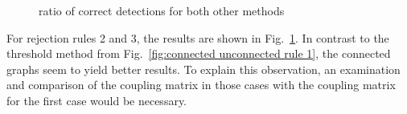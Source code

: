 \documentclass{article}
\begin{document}
	 	
	\begin{figure}[h]
	\caption{ratio of correct detections for both other methods}
	\label{fig:connected unconnected rule 2 and 3}
	\end{figure}
For rejection rules 2 and 3, the results are shown in Fig.~\ref{fig:connected unconnected rule 2 and 3}. In contrast to the threshold method from Fig.~\ref{fig:connected unconnected rule 1}, the connected graphs seem to yield better results. To explain this observation, an examination and comparison of the coupling matrix in those cases with the coupling matrix for the first case would be necessary. 


	
\end{document}
